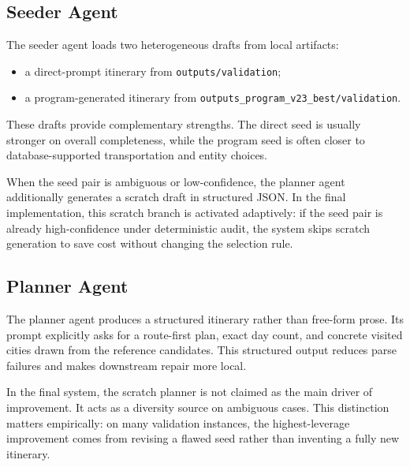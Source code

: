 \documentclass{article}
\begin{document}
\subsection{Seeder Agent}
The seeder agent loads two heterogeneous drafts from local artifacts:
\begin{itemize}[leftmargin=1.5em]
    \item a direct-prompt itinerary from \texttt{outputs/validation};
    \item a program-generated itinerary from \texttt{outputs\_program\_v23\_best/validation}.
\end{itemize}
These drafts provide complementary strengths. The direct seed is usually stronger on overall completeness, while the program seed is often closer to database-supported transportation and entity choices.

When the seed pair is ambiguous or low-confidence, the planner agent additionally generates a scratch draft in structured JSON. In the final implementation, this scratch branch is activated adaptively: if the seed pair is already high-confidence under deterministic audit, the system skips scratch generation to save cost without changing the selection rule.

\subsection{Planner Agent}
The planner agent produces a structured itinerary rather than free-form prose. Its prompt explicitly asks for a route-first plan, exact day count, and concrete visited cities drawn from the reference candidates. This structured output reduces parse failures and makes downstream repair more local.

In the final system, the scratch planner is not claimed as the main driver of improvement. It acts as a diversity source on ambiguous cases. This distinction matters empirically: on many validation instances, the highest-leverage improvement comes from revising a flawed seed rather than inventing a fully new itinerary.
\end{document}
